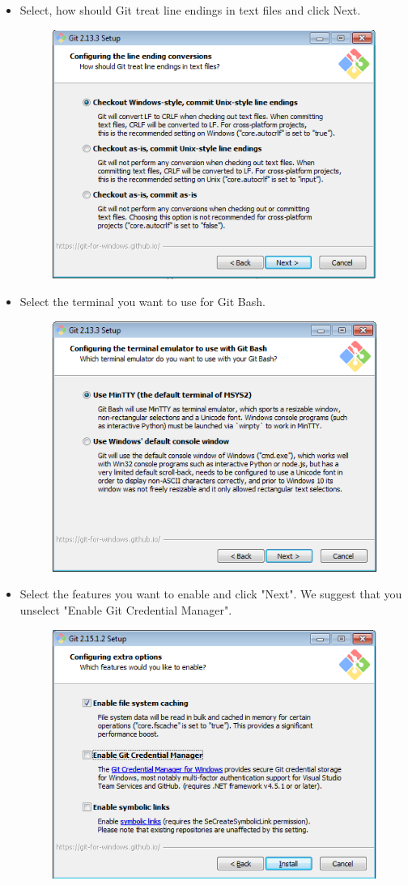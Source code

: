 \documentclass[11pt]{article} %
\begin{document}
\begin{itemize}
    	\pagebreak
    	\item Select, how should Git treat line endings in text files and click Next. 
    		\begin{figure}[h!]
    			\centering
    			\includegraphics[width=0.7\linewidth]{figs/GitBash7}
    			\caption{}
    			\label{fig:gitbash7}
    		\end{figure}
    	\item Select the terminal you want to use for Git Bash. 
    
    		\begin{figure}[h!]
    			\centering
    			\includegraphics[width=0.7\linewidth]{figs/GitBash8}
    			\caption{}
    			\label{fig:gitbash8}
    		\end{figure}
    	\pagebreak
    	\item Select the features you want to enable and click "Next". 
      We suggest that you unselect "Enable Git Credential Manager". 
    		\begin{figure}[h!]
    			\centering
    			\includegraphics[width=0.7\linewidth]{figs/git4}
    			\caption{}
    			\label{fig:gitbash9}
    		\end{figure}
    

\end{itemize}
\end{document}
